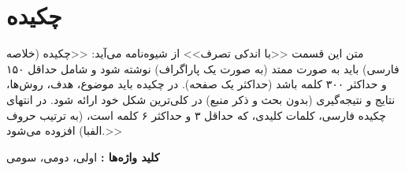 \chapter*{چکیده}
\label{ch0-fa}


متن این قسمت <<با اندکی تصرف>> از شیوه‌نامه می‌آید: <<چکیده (خلاصه فارسی) باید به صورت ممتد (به صورت یک پاراگراف) نوشته شود و شامل حداقل ۱۵۰ و حداکثر ۳۰۰ کلمه باشد (حداکثر یک صفحه). در چکیده باید موضوع، هدف، روش‌ها، نتایج و نتیجه‌گیری (بدون بحث و ذکر منبع) در کلی‌ترین شکل خود ارائه شود. در انتهای چکیده فارسی، کلمات کلیدی، که حداقل ۳ و حداکثر ۶ کلمه است، (به ترتیب حروف الفبا) افزوده می‌شود.>> 

\bigskip
\textbf{کلید واژه‌ها :} اولی، دومی، سومی
\clearpage


